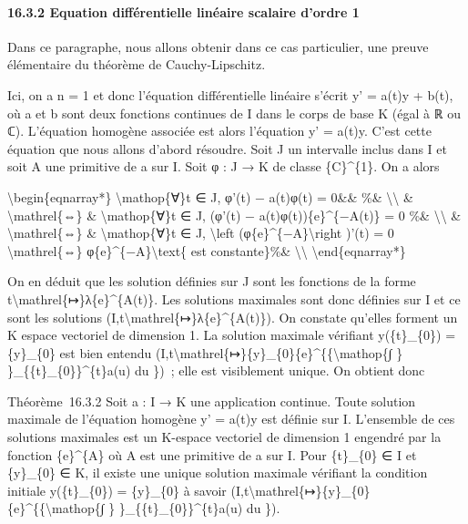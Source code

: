 \documentclass[]{article}
\begin{document}
\paragraph{16.3.2 Equation différentielle linéaire scalaire d'ordre 1}

Dans ce paragraphe, nous allons obtenir dans ce cas particulier, une
preuve élémentaire du théorème de Cauchy-Lipschitz.

Ici, on a n = 1 et donc l'équation différentielle linéaire s'écrit y' =
a(t)y + b(t), où a et b sont deux fonctions continues de I dans le corps
de base K (égal à ℝ ou ℂ). L'équation homogène associée est alors
l'équation y' = a(t)y. C'est cette équation que nous allons d'abord
résoudre. Soit J un intervalle inclus dans I et soit A une primitive de
a sur I. Soit φ : J → K de classe \{C\}\^{}\{1\}. On a alors

\textbackslash{}begin\{eqnarray*\} \textbackslash{}mathop\{∀\}t ∈ J,
φ'(t) − a(t)φ(t) = 0\&\& \%\& \textbackslash{}\textbackslash{} \&
\textbackslash{}mathrel\{⇔\} \& \textbackslash{}mathop\{∀\}t ∈ J, (φ'(t)
− a(t)φ(t))\{e\}\^{}\{−A(t)\} = 0 \%\& \textbackslash{}\textbackslash{}
\& \textbackslash{}mathrel\{⇔\} \& \textbackslash{}mathop\{∀\}t ∈ J,
\textbackslash{}left (φ\{e\}\^{}\{−A\}\textbackslash{}right )'(t) = 0
\textbackslash{}mathrel\{⇔\} φ\{e\}\^{}\{−A\}\textbackslash{}text\{ est
constante\}\%\& \textbackslash{}\textbackslash{}
\textbackslash{}end\{eqnarray*\}

On en déduit que les solution définies sur J sont les fonctions de la
forme t\textbackslash{}mathrel\{↦\}λ\{e\}\^{}\{A(t)\}. Les solutions
maximales sont donc définies sur I et ce sont les solutions
(I,t\textbackslash{}mathrel\{↦\}λ\{e\}\^{}\{A(t)\}). On constate
qu'elles forment un K espace vectoriel de dimension 1. La solution
maximale vérifiant y(\{t\}\_\{0\}) = \{y\}\_\{0\} est bien entendu
(I,t\textbackslash{}mathrel\{↦\}\{y\}\_\{0\}\{e\}\^{}\{\{\textbackslash{}mathop\{∫
\} \}\_\{\{t\}\_\{0\}\}\^{}\{t\}a(u) du \})~; elle est visiblement
unique. On obtient donc

Théorème~16.3.2 Soit a : I → K une application continue. Toute solution
maximale de l'équation homogène y' = a(t)y est définie sur I. L'ensemble
de ces solutions maximales est un K-espace vectoriel de dimension 1
engendré par la fonction \{e\}\^{}\{A\} où A est une primitive de a sur
I. Pour \{t\}\_\{0\} ∈ I et \{y\}\_\{0\} ∈ K, il existe une unique
solution maximale vérifiant la condition initiale y(\{t\}\_\{0\}) =
\{y\}\_\{0\} à savoir
(I,t\textbackslash{}mathrel\{↦\}\{y\}\_\{0\}\{e\}\^{}\{\{\textbackslash{}mathop\{∫
\} \}\_\{\{t\}\_\{0\}\}\^{}\{t\}a(u) du \}).
\end{document}
